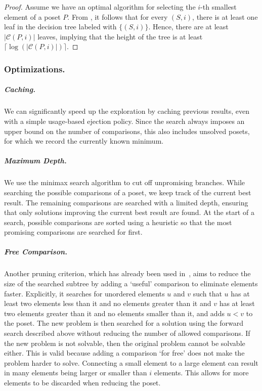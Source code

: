 \documentclass[a4paper,UKenglish,cleveref, autoref, thm-restate]{lipics-v2021}
\begin{document}
\begin{proof}
  Assume we have an optimal algorithm for selecting the $i$-th smallest element of a poset $P$.
  From , it follows that for every $(S, i)$, there is at least one leaf in the decision tree labeled with $\{(S, i)\}$.
  Hence, there are at least $|\mathcal{C}(P, i)|$ leaves, implying that the height of the tree is at least $\lceil\log(|\mathcal{C}(P, i)|)\rceil$.
\end{proof}

\subsubsection{Optimizations.}

\subparagraph{Caching.}
We can significantly speed up the exploration by caching previous results, even with a simple usage-based ejection policy.
Since the search always imposes an upper bound on the number of comparisons, this also includes unsolved posets, for which we record the currently known minimum.

\subparagraph{Maximum Depth.}
We use the minimax search algorithm to cut off unpromising branches.
While searching the possible comparisons of a poset, we keep track of the current best result.
The remaining comparisons are searched with a limited depth, ensuring that only solutions improving the current best result are found.
At the start of a search, possible comparisons are sorted using a heuristic so that the most promising comparisons are searched for first.

\subparagraph{Free Comparison.}
Another pruning criterion, which has already been used in~\cite{Oksanen}, aims to reduce the size of the searched subtree by adding a `useful' comparison to eliminate elements faster.
Explicitly, it searches for unordered elements $u$ and $v$ such that $u$ has at least two elements less than it and no elements greater than it and $v$ has at least two elements greater than it and no elements smaller than it, and adds $u < v$ to the poset.
The new problem is then searched for a solution using the forward search described above without reducing the number of allowed comparisons.
If the new problem is not solvable, then the original problem cannot be solvable either.
This is valid because adding a comparison `for free' does not make the problem harder to solve.
Connecting a small element to a large element can result in many elements being larger or smaller than $i$ elements.
This allows for more elements to be discarded when reducing the poset.
\end{document}
